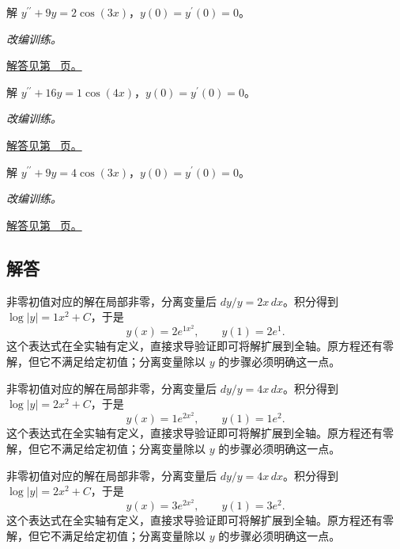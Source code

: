 \documentclass[UTF8,12pt,a4paper,fontset=fandol]{ctexart}
\begin{document}
\begin{example}[共振强迫振动]\label{ex:c23q22}
解 $y^{\prime\prime}+9y=2\cos(3x)$，$y(0)=y^{\prime}(0)=0$。
\par\textit{改编训练。}\par\hyperref[ans:c23q22]{解答见第~\pageref{ans:c23q22} 页。}
\end{example}
\begin{example}[共振强迫振动]\label{ex:c23q23}
解 $y^{\prime\prime}+16y=1\cos(4x)$，$y(0)=y^{\prime}(0)=0$。
\par\textit{改编训练。}\par\hyperref[ans:c23q23]{解答见第~\pageref{ans:c23q23} 页。}
\end{example}
\begin{example}[共振强迫振动]\label{ex:c23q24}
解 $y^{\prime\prime}+9y=4\cos(3x)$，$y(0)=y^{\prime}(0)=0$。
\par\textit{改编训练。}\par\hyperref[ans:c23q24]{解答见第~\pageref{ans:c23q24} 页。}
\end{example}
\subsection{解答}
\begin{solve}\label{ans:c23q1}
非零初值对应的解在局部非零，分离变量后 $dy/y=2x\,dx$。积分得到 $\log|y|=1x^2+C$，于是
\[
y(x)=2e^{1x^2},\qquad y(1)=2e^{1}.
\]
这个表达式在全实轴有定义，直接求导验证即可将解扩展到全轴。原方程还有零解，但它不满足给定初值；分离变量除以 $y$ 的步骤必须明确这一点。
\end{solve}

\begin{solve}\label{ans:c23q2}
非零初值对应的解在局部非零，分离变量后 $dy/y=4x\,dx$。积分得到 $\log|y|=2x^2+C$，于是
\[
y(x)=1e^{2x^2},\qquad y(1)=1e^{2}.
\]
这个表达式在全实轴有定义，直接求导验证即可将解扩展到全轴。原方程还有零解，但它不满足给定初值；分离变量除以 $y$ 的步骤必须明确这一点。
\end{solve}

\begin{solve}\label{ans:c23q3}
非零初值对应的解在局部非零，分离变量后 $dy/y=4x\,dx$。积分得到 $\log|y|=2x^2+C$，于是
\[
y(x)=3e^{2x^2},\qquad y(1)=3e^{2}.
\]
这个表达式在全实轴有定义，直接求导验证即可将解扩展到全轴。原方程还有零解，但它不满足给定初值；分离变量除以 $y$ 的步骤必须明确这一点。
\end{solve}
\end{document}
